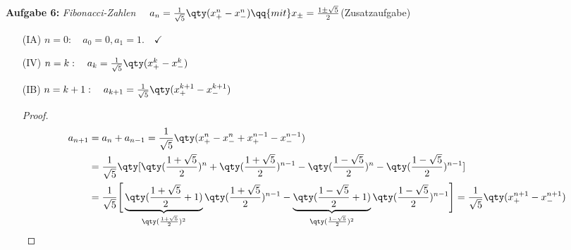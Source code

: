 \newpage
\textbf{Aufgabe 6: } \emph{Fibonacci-Zahlen} $\quad a_n=\frac{1}{\sqrt{5}}\qty(x_+^n-x_-^n) \qq{mit}x_\pm = \frac{1\pm \sqrt{5}}{2}$\hfill (Zusatzaufgabe)

\begin{enumerate}
    \setlength{\mathindent}{0cm}
    \item[(IA)] $n=0: \quad a_0 = 0, a_1 = 1. \quad\checkmark$ 
    \item[(IV)] $n=k: \quad a_k = \frac{1}{\sqrt{5}}\qty(x_+^k-x_-^k)$
    \item[(IB)] $n=k+1: \quad a_{k+1} = \frac{1}{\sqrt{5}}\qty(x_+^{k+1}-x_-^{k+1})$
    \begin{proof}
        \begin{align}
            a_{n+1}&=a_n+a_{n-1}=\frac{1}{\sqrt{5}}\qty(x_+^n-x_-^n+x_+^{n-1}-x_-^{n-1})\\
            &=\frac{1}{\sqrt{5}}\qty[\qty(\frac{1+\sqrt{5}}{2})^n+\qty(\frac{1+\sqrt{5}}{2})^{n-1}-\qty(\frac{1-\sqrt{5}}{2})^n-\qty(\frac{1-\sqrt{5}}{2})^{n-1}]\\
            &=\frac{1}{\sqrt{5}}\Bigg[\underbrace{\qty(\frac{1+\sqrt{5}}{2}+1)}_{\qty(\frac{1+\sqrt{5}}{2})^2}\qty(\frac{1+\sqrt{5}}{2})^{n-1}-\underbrace{\qty(\frac{1-\sqrt{5}}{2}+1)}_{\qty(\frac{1-\sqrt{5}}{2})^2}\qty(\frac{1-\sqrt{5}}{2})^{n-1}\Bigg]
            =\frac{1}{\sqrt{5}}\qty(x_+^{n+1}-x_-^{n+1})
        \end{align}
    \end{proof}
\end{enumerate}
%
%
